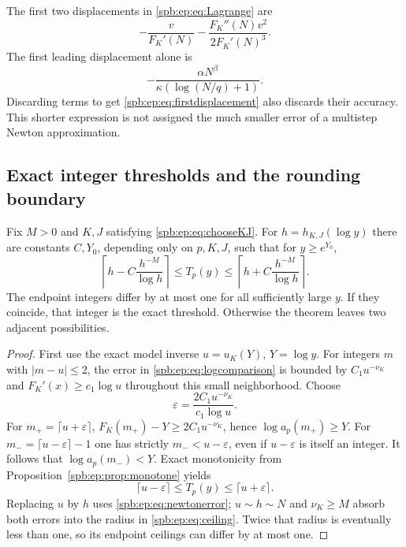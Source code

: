 The first two displacements in \eqref{spb:ep:eq:Lagrange} are
\begin{equation}\label{spb:ep:eq:firstLagrange}
 -\frac v{F_K'(N)}-\frac{F_K''(N)v^2}{2F_K'(N)^3}.
\end{equation}
The first leading displacement alone is
\begin{equation}\label{spb:ep:eq:firstdisplacement}
 -\frac{\alpha N^\beta}{\kappa(\log(N/q)+1)}.
\end{equation}
Discarding terms to get \eqref{spb:ep:eq:firstdisplacement} also discards their
accuracy. This shorter expression is not assigned the much smaller error
of a multistep Newton approximation.

\subsection{Exact integer thresholds and the rounding boundary}
\begin{theorem}\label{spb:ep:thm:threshold}
Fix $M>0$ and $K,J$ satisfying \eqref{spb:ep:eq:chooseKJ}.
For $h=h_{K,J}(\log y)$ there are constants $C,Y_0$, depending only on
$p,K,J$, such that for $y\ge e^{Y_0}$,
\begin{equation}\label{spb:ep:eq:ceiling}
 \left\lceil h-C\frac{h^{-M}}{\log h}\right\rceil
       \le T_p(y)\le
 \left\lceil h+C\frac{h^{-M}}{\log h}\right\rceil.
\end{equation}
The endpoint integers differ by at most one for all sufficiently large $y$.
If they coincide, that integer is the exact threshold. Otherwise the theorem
leaves two adjacent possibilities.
\end{theorem}
\begin{proof}
First use the exact model inverse $u=u_K(Y)$, $Y=\log y$.
For integers $m$ with $|m-u|\le2$, the error in
\eqref{spb:ep:eq:logcomparison} is bounded by $C_1u^{-\nu_K}$ and
$F_K'(x)\ge c_1\log u$ throughout this small neighborhood.
Choose
\[
 \varepsilon=\frac{2C_1u^{-\nu_K}}{c_1\log u}.
\]
For $m_+=\lceil u+\varepsilon\rceil$,
$F_K(m_+)-Y\ge2C_1u^{-\nu_K}$, hence
$\log a_p(m_+)\ge Y$.
For $m_-=\lceil u-\varepsilon\rceil-1$ one has strictly
$m_-<u-\varepsilon$, even if $u-\varepsilon$ is itself an integer.
It follows that $\log a_p(m_-)<Y$.
Exact monotonicity from Proposition~\ref{spb:ep:prop:monotone} yields
\[
 \lceil u-\varepsilon\rceil\le T_p(y)
                         \le\lceil u+\varepsilon\rceil.
\]
Replacing $u$ by $h$ uses \eqref{spb:ep:eq:newtonerror}; $u\sim h\sim N$ and
$\nu_K\ge M$ absorb both errors into the radius in \eqref{spb:ep:eq:ceiling}.
Twice that radius is eventually less than one, so its endpoint ceilings
can differ by at most one.
\end{proof}

